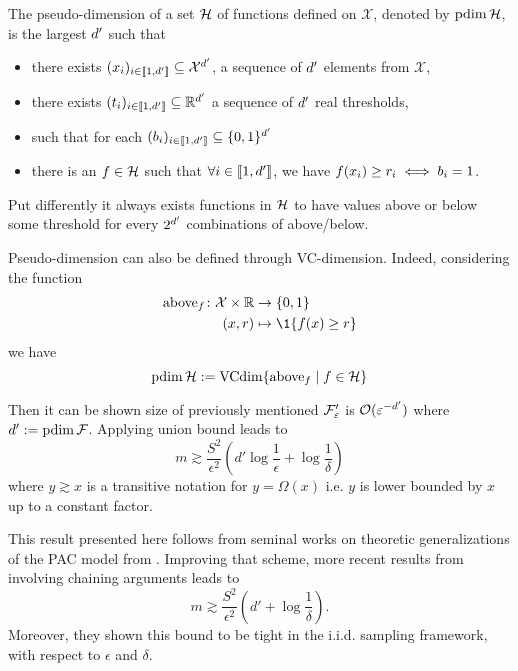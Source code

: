 \begin{tcolorbox}
	\begin{definition}
		The pseudo-dimension of a set $\mathcal{H}$ of functions defined on $\mathcal{X}$, denoted by $\operatorname{pdim}\mathcal{H}$, is the largest ${d'}$ such that 
	\begin{itemize}
		\item there exists $(x_{i})_{i\in \llbracket 1,{d'} \rrbracket} \subseteq \mathcal{X}^{d'}$, a sequence of ${d'}$ elements from $\mathcal{X}$,
		\item there exists $(t_i)_{i\in \llbracket 1,{d'} \rrbracket} \subseteq  \mathbb{R}^{d'}$ a sequence of ${d'}$ real thresholds,
		\item such that for each $(b_i)_{i\in \llbracket 1,{d'} \rrbracket} \subseteq \{0,1\}^{d'}$
		\item there is an $f \in \mathcal{H}$ such that $\forall i \in \llbracket 1,{d'} \rrbracket$, we have $f(x_i) \geq r_i \iff b_i = 1$. 
	\end{itemize}
	Put differently it always exists functions in $\mathcal{H}$ to have values above or below some threshold for every $2^{d'}$ combinations of above/below.
\end{definition}
Pseudo-dimension can also be defined through VC-dimension. Indeed, considering the function
\begin{align*}
	\operatorname{above}_\query \colon \mathcal{X} \times \RR &\to \{0,1\}\\
	(x,r) &\mapsto \1\{f(x) \geq r\}
\end{align*}
we have
\begin{equation}
	\operatorname{pdim}\mathcal{H} := \operatorname{VCdim}\{\operatorname{above}_f \mid f \in \mathcal{H}\}
\end{equation}
\end{tcolorbox}

Then it can be shown size of previously mentioned $\mathcal{F}'_\varepsilon$ is $\mathcal{O}(\varepsilon^{-{d'}})$ where ${d'}:=\operatorname{pdim}\mathcal{F}$. Applying union bound leads to
\begin{equation*}
	m \gtrsim \frac{S^{2}}{\epsilon^{2}} (d'\log\frac{1}{\epsilon} + \log \frac{1}{\delta})
\end{equation*}
where $y \gtrsim x$ is a transitive notation for $y = \Omega(x)$ i.e. $y$ is lower bounded by $x$ up to a constant factor.

This result presented here follows from seminal works on theoretic generalizations of the PAC model from \cite{haussler1992decisiontheoricgeneralizationofPACmodel}.
Improving that scheme, more recent results from \cite{li2001_improved_bound_sample_complexity} involving chaining arguments leads to
\begin{equation*}
	m \gtrsim \frac{S^{2}}{\epsilon^{2}} (d' + \log \frac{1}{\delta}).
\end{equation*}
Moreover, they shown this bound to be tight in the i.i.d. sampling framework, with respect to $\epsilon$ and $\delta$.

